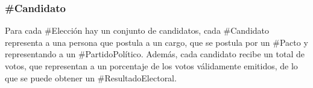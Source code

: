 \subsubsection{\#Candidato}

Para cada \#Elección hay un conjunto de candidatos, cada \#Candidato
representa a una persona que postula a un cargo, que se postula por un
\#Pacto y representando a un \#PartidoPolítico. Además, cada candidato
recibe un total de votos, que representan a un porcentaje de los votos
válidamente emitidos, de lo que se puede obtener un
\#ResultadoElectoral.

\begin{description}
  
\end{description}
